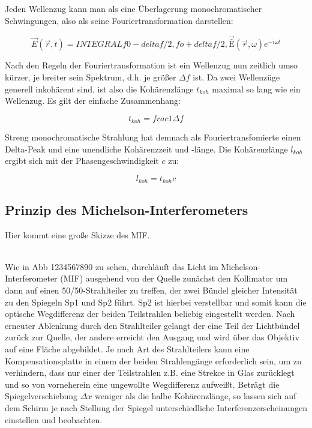 		 Jeden Wellenzug kann man als eine Überlagerung monochromatischer Schwingungen, also als seine Fouriertransformation darstellen:

		 \[\vec{E}(\vec{r}, t) = INTEGRAL f0-delta f/2, fo+ delta f/2, \vec{Ẽ}(\vec{r}, \omega) 
		 e ^{-i \omega t}\]

		 Nach den Regeln der Fouriertransformation ist ein Wellenzug nun zeitlich umso kürzer, je breiter sein Spektrum, d.h. je größer $\Delta f$ ist.
		 Da zwei Wellenzüge generell inkohärent sind, ist also die Kohärenzlänge $t_{koh}$ maximal so lang wie ein Wellenzug.
		 Es gilt der einfache Zusammenhang:

		 \[ t_{koh} = frac{1}{\Delta f} \]

		 Streng monochromatische Strahlung hat demnach als Fouriertransfomierte einen Delta-Peak und eine unendliche Kohärenzzeit und -länge.
		 Die Kohärenzlänge $l_{koh}$ ergibt sich mit der Phasengeschwindigkeit $c$ zu:

		 \[l_{koh} = t_{koh} c\]



	\subsection{Prinzip des Michelson-Interferometers} %
	\label{sub:prinzip_des_michelson_interferometers}

		Hier kommt eine große Skizze des MIF.

		\\
		Wie in Abb 1234567890 zu sehen, durchläuft das Licht im Michelson-Interferometer (MIF) ausgehend von der Quelle zunächst den Kollimator um dann auf einen 50/50-Strahlteiler zu treffen, der zwei Bündel gleicher Intensität zu den Spiegeln Sp1 und Sp2 führt. 
		Sp2 ist hierbei verstellbar und somit kann die optische Wegdifferenz der beiden Teilstrahlen beliebig eingestellt werden.
		Nach erneuter Ablenkung durch den Strahlteiler gelangt der eine Teil der Lichtbündel zurück zur Quelle, der andere erreicht den Ausgang und wird über das Objektiv auf eine Fläche abgebildet.
		Je nach Art des Strahlteilers kann eine Kompensationsplatte in einem der beiden Strahlengänge erforderlich sein, um zu verhindern, dass nur einer der Teilstrahlen z.B. eine Strekce in Glas zurücklegt und so von vorneherein eine ungewollte Wegdifferenz aufweißt.
		Beträgt die Spiegelverschiebung $\Delta x$ weniger als die halbe Kohärenzlänge, so lassen sich auf dem Schirm je nach Stellung der Spiegel unterschiedliche Interferenzerscheinungen einstellen und beobachten.
	

